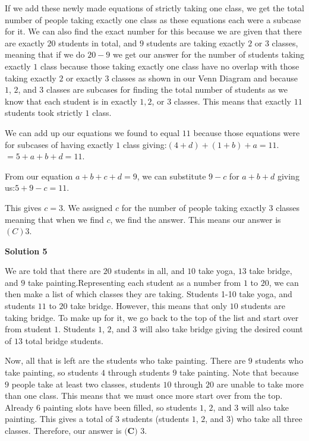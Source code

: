 \begin{enumerate}
 
If we add these newly made equations of strictly taking one class, we get the total number of people taking exactly one class as these equations each were a subcase for it. We can also find the exact number for this because we are given that there are exactly $20$ students in total, and $9$ students are taking exactly $2$ or $3$ classes, meaning that if we do $20-9$ we get our answer for the number of students taking exactly $1$ class because those taking exactly one class have no overlap with those taking exactly $2$ or exactly $3$ classes as shown in our Venn Diagram and because $1$, $2$, and $3$ classes are subcases for finding the total number of students as we know that each student is in exactly $1, 2$, or $3$ classes. This means that exactly $11$ students took strictly $1$ class.

 We can add up our equations we found to equal $11$ because those equations were for subcases of having exactly $1$ class giving:$(4+d)+(1+b)+a=11$.$=5+a+b+d=11$.

 From our equation $a+b+c+d=9$, we can substitute $9-c$ for $a+b+d$ giving us:$5+9-c=11$.

 This gives $c=3$. We assigned $c$ for the number of people taking exactly $3$ classes meaning that when we find $c$, we find the answer. This means our answer is $\boxed{(C) 3}$.

 



\textbf{Solution 5}

We are told that there are $20$ students in all, and $10$ take yoga, $13$ take bridge, and $9$ take painting.Representing each student as a number from $1$ to $20$, we can then make a list of which classes they are taking. Students 1-10 take yoga, and students $11$ to $20$ take bridge. However, this means that only $10$ students are taking bridge. To make up for it, we go back to the top of the list and start over from student $1$. Students $1$, $2$, and $3$ will also take bridge giving the desired count of $13$ total bridge students. 

 Now, all that is left are the students who take painting. There are $9$ students who take painting, so students $4$ through students $9$ take painting. Note that because $9$ people take at least two classes, students $10$ through $20$ are unable to take more than one class. This means that we must once more start over from the top. Already $6$ painting slots have been filled, so students $1$, $2$, and $3$ will also take painting. This gives a total of $3$ students (students $1$, $2$, and $3$) who take all three classes. Therefore, our answer is $\boxed{\textbf{(C) } 3}$.


\end{enumerate}
